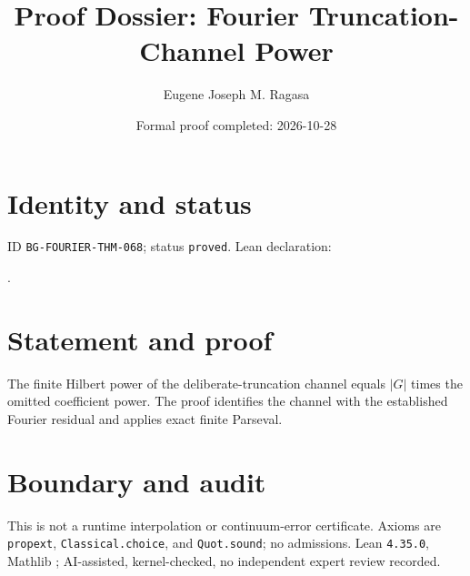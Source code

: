 \documentclass[11pt]{article}
\title{Proof Dossier: Fourier Truncation-Channel Power}\author{Eugene Joseph M. Ragasa}\date{Formal proof completed: 2026-10-28}
\begin{document}
\raggedright\maketitle
\section{Identity and status}
ID \texttt{BG-FOURIER-THM-068}; status \texttt{proved}. Lean declaration:
\par{}.
\section{Statement and proof}
The finite Hilbert power of the deliberate-truncation channel equals $|G|$ times the omitted coefficient power. The proof identifies the channel with the established Fourier residual and applies exact finite Parseval.
\section{Boundary and audit}
This is not a runtime interpolation or continuum-error certificate. Axioms are \texttt{propext}, \texttt{Classical.choice}, and \texttt{Quot.sound}; no admissions. Lean \texttt{4.35.0}, Mathlib {\scriptsize{}}; AI-assisted, kernel-checked, no independent expert review recorded.
\end{document}
